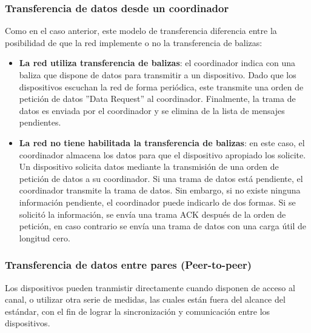 \subsubsection{Transferencia de datos desde un coordinador}
Como en el caso anterior, este modelo de transferencia diferencia entre la posibilidad de que la red implemente o no la transferencia de balizas: 
\begin{itemize}
\item{\bf La red utiliza transferencia de balizas}: el coordinador indica con una baliza que dispone de datos para transmitir a un dispositivo. Dado que los dispositivos escuchan la red de forma periódica, este transmite una orden de petición de datos ''Data Request'' al coordinador. Finalmente, la trama de datos es enviada por el coordinador y se elimina de la lista de mensajes pendientes.
\item{\bf La red no tiene habilitada la transferencia de balizas}: en este caso, el coordinador almacena los datos para que el dispositivo apropiado los solicite. Un dispositivo solicita datos mediante la transmisión de una orden de petición de datos a su coordinador. Si una trama de datos está pendiente, el coordinador transmite la trama de datos. Sin embargo, si no existe ninguna información pendiente, el coordinador puede indicarlo de dos formas. Si se solicitó la información, se envía una trama ACK después de la orden de petición, en caso contrario se envía una trama de datos con una carga útil de longitud cero.
\end{itemize}
\subsubsection{Transferencia de datos entre pares (Peer-to-peer)}
Los dispositivos pueden tranmistir directamente cuando disponen de acceso al canal, o utilizar otra serie de medidas, las cuales están fuera del alcance del estándar, con el fin de lograr la sincronización y comunicación entre los dispositivos.


\clearpage
